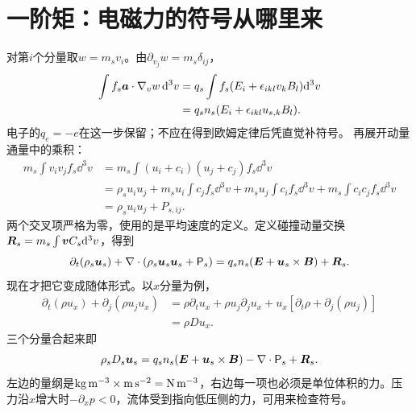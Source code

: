 \section{一阶矩：电磁力的符号从哪里来}
对第$i$个分量取$w=m_sv_i$。由$\partial_{v_j}w=m_s\delta_{ij}$，
\begin{align}
 \int f_s\bm{a}\cdot\nabla_vw\,\mathrm d^3v
 &=q_s\int f_s(E_i+\epsilon_{ikl}v_kB_l)\mathrm d^3v\\
 &=q_sn_s(E_i+\epsilon_{ikl}u_{s,k}B_l).
\end{align}
电子的$q_e=-e$在这一步保留；不应在得到欧姆定律后凭直觉补符号。
再展开动量通量中的乘积：
\begin{align}
 m_s\int v_iv_jf_s\dd^3v
 &=m_s\int(u_i+c_i)(u_j+c_j)f_s\dd^3v\\
 &=\rho_su_iu_j+
 m_su_i\int c_jf_s\dd^3v+
 m_su_j\int c_if_s\dd^3v+
 m_s\int c_ic_jf_s\dd^3v\\
 &=\rho_su_iu_j+P_{s,ij}.
\end{align}
两个交叉项严格为零，使用的是平均速度的定义。定义碰撞动量交换$\bm{R}_s=m_s\int\bm{v}C_s\mathrm d^3v$，得到
\begin{equation}
 \partial_t(\rho_s\bm{u}_s)+
 \nabla\cdot(\rho_s\bm{u}_s\bm{u}_s+\mathsf P_s)
 =q_sn_s(\bm{E}+\bm{u}_s\times\bm{B})+\bm{R}_s.
 \label{hall:eq:momentum}
\end{equation}
现在才把它变成随体形式。以$x$分量为例，
\begin{align}
 \partial_t(\rho u_x)+\partial_j(\rho u_ju_x)
 &=\rho\partial_tu_x+\rho u_j\partial_ju_x
   +u_x[\partial_t\rho+\partial_j(\rho u_j)]\\
 &=\rho Du_x.
\end{align}
三个分量合起来即
\begin{equation}
 \rho_sD_s\bm{u}_s=q_sn_s(\bm{E}+\bm{u}_s\times\bm{B})
                  -\nabla\cdot\mathsf P_s+\bm{R}_s.
 \label{hall:eq:speciesmom}
\end{equation}
左边的量纲是$ {\rm kg\,m^{-3}}\times{\rm m\,s^{-2}}={\rm N\,m^{-3}}$，右边每一项也必须是单位体积的力。压力沿$x$增大时$-\partial_xp<0$，流体受到指向低压侧的力，可用来检查符号。

